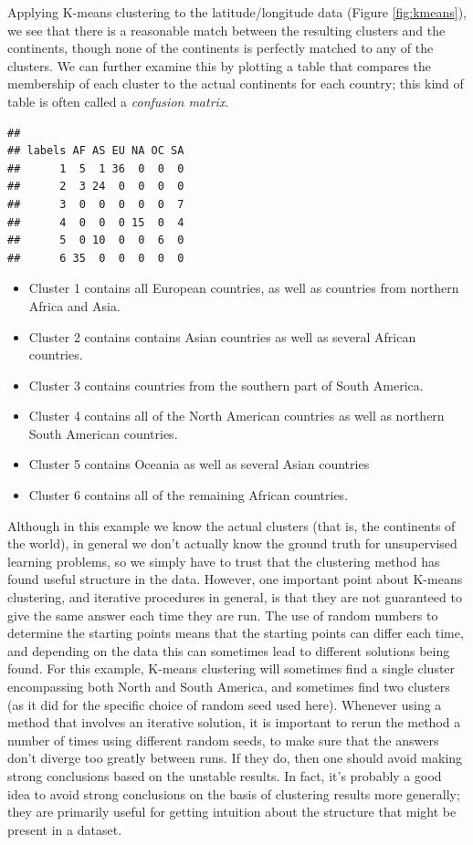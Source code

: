 \documentclass[
  12pt,
]{book}
\providecommand{\tightlist}{%
  \setlength{\itemsep}{0pt}\setlength{\parskip}{0pt}}
\begin{document}
Applying K-means clustering to the latitude/longitude data (Figure \ref{fig:kmeans}), we see that there is a reasonable match between the resulting clusters and the continents, though none of the continents is perfectly matched to any of the clusters. We can further examine this by plotting a table that compares the membership of each cluster to the actual continents for each country; this kind of table is often called a \emph{confusion matrix}.

\begin{verbatim}
##       
## labels AF AS EU NA OC SA
##      1  5  1 36  0  0  0
##      2  3 24  0  0  0  0
##      3  0  0  0  0  0  7
##      4  0  0  0 15  0  4
##      5  0 10  0  0  6  0
##      6 35  0  0  0  0  0
\end{verbatim}

\begin{itemize}
\tightlist
\item
  Cluster 1 contains all European countries, as well as countries from northern Africa and Asia.
\item
  Cluster 2 contains contains Asian countries as well as several African countries.
\item
  Cluster 3 contains countries from the southern part of South America.
\item
  Cluster 4 contains all of the North American countries as well as northern South American countries.
\item
  Cluster 5 contains Oceania as well as several Asian countries
\item
  Cluster 6 contains all of the remaining African countries.
\end{itemize}

Although in this example we know the actual clusters (that is, the continents of the world), in general we don't actually know the ground truth for unsupervised learning problems, so we simply have to trust that the clustering method has found useful structure in the data. However, one important point about K-means clustering, and iterative procedures in general, is that they are not guaranteed to give the same answer each time they are run. The use of random numbers to determine the starting points means that the starting points can differ each time, and depending on the data this can sometimes lead to different solutions being found. For this example, K-means clustering will sometimes find a single cluster encompassing both North and South America, and sometimes find two clusters (as it did for the specific choice of random seed used here). Whenever using a method that involves an iterative solution, it is important to rerun the method a number of times using different random seeds, to make sure that the answers don't diverge too greatly between runs. If they do, then one should avoid making strong conclusions based on the unstable results. In fact, it's probably a good idea to avoid strong conclusions on the basis of clustering results more generally; they are primarily useful for getting intuition about the structure that might be present in a dataset.
\end{document}
